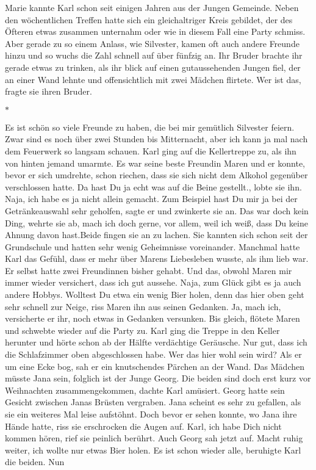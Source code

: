 \documentclass{article}
\begin{document}
	Marie kannte Karl schon seit einigen Jahren aus der Jungen Gemeinde. Neben den wöchentlichen Treffen hatte sich ein gleichaltriger Kreis gebildet, der des Öfteren etwas zusammen unternahm oder wie in diesem Fall eine Party schmiss. Aber gerade zu so einem Anlass, wie Silvester, kamen oft auch andere Freunde hinzu und so wuchs die Zahl schnell auf über fünfzig an. Ihr Bruder brachte ihr gerade etwas zu trinken, als ihr blick auf einen gutaussehenden Jungen fiel, der an einer Wand lehnte und offensichtlich mit zwei Mädchen flirtete. \guillemotright Wer ist das\guillemotleft, fragte sie ihren Bruder.
	
	\begin{center}
		$\ast$
	\end{center}

	Es ist schön so viele Freunde zu haben, die bei mir gemütlich Silvester feiern. Zwar sind es noch über zwei Stunden bis Mitternacht, aber ich kann ja mal nach dem Feuerwerk so langsam schauen. Karl ging auf die Kellertreppe zu, als ihn von hinten jemand umarmte. Es war seine beste Freundin Maren und er konnte, bevor er sich umdrehte, schon riechen, dass sie sich nicht dem Alkohol gegenüber verschlossen hatte. \guillemotright Da hast Du ja echt was auf die Beine gestellt.\guillemotleft, lobte sie ihn. \guillemotright Naja, ich habe es ja nicht allein gemacht. Zum Beispiel hast Du mir ja bei der Getränkeauswahl sehr geholfen\guillemotleft, sagte er und zwinkerte sie an. \guillemotright Das war doch kein Ding\guillemotleft, wehrte sie ab, \guillemotright mach ich doch gerne, vor allem, weil ich weiß, dass Du keine Ahnung davon hast.\guillemotleft Beide fingen sie an zu lachen. Sie kannten sich schon seit der Grundschule und hatten sehr wenig Geheimnisse voreinander. Manchmal hatte Karl das Gefühl, dass er mehr über Marens Liebesleben wusste, als ihm lieb war. Er selbst hatte zwei Freundinnen bisher gehabt. Und das, obwohl Maren mir immer wieder versichert, dass ich gut aussehe. Naja, zum Glück gibt es ja auch andere Hobbys. \guillemotright Wolltest Du etwa ein wenig Bier holen, denn das hier oben geht sehr schnell zur Neige\guillemotleft, riss Maren ihn aus seinen Gedanken. \guillemotright Ja, mach ich\guillemotleft, versicherte er ihr, noch etwas in Gedanken versunken. \guillemotright Bis gleich\guillemotleft, flötete Maren und schwebte wieder auf die Party zu. Karl ging die Treppe in den Keller herunter und hörte schon ab der Hälfte verdächtige Geräusche. Nur gut, dass ich die Schlafzimmer oben abgeschlossen habe. Wer das hier wohl sein wird? Als er um eine Ecke bog, sah er ein knutschendes Pärchen an der Wand. Das Mädchen müsste Jana sein, folglich ist der Junge Georg. Die beiden sind doch erst kurz vor Weihnachten zusammengekommen, dachte Karl amüsiert. Georg hatte sein Gesicht zwischen Janas Brüsten vergraben. Jana scheint es sehr zu gefallen, als sie ein weiteres Mal leise aufstöhnt. Doch bevor er sehen konnte, wo Jana ihre Hände hatte, riss sie erschrocken die Augen auf. \guillemotright Karl, ich habe Dich nicht kommen hören\guillemotleft, rief sie peinlich berührt. Auch Georg sah jetzt auf. \guillemotright Macht ruhig weiter, ich wollte nur etwas Bier holen. Es ist schon wieder alle\guillemotleft, beruhigte Karl die beiden. Nun 
\end{document}
